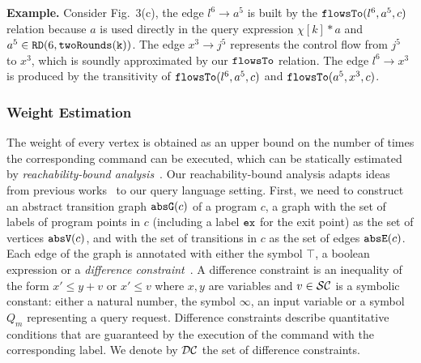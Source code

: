 \textbf{Example.}
Consider Fig.~3(c),  
the edge $l^6 \to a^5$ is built by the $\mathtt{flowsTo}(l^6, a^5, c)$ relation because
$a$ is used directly in the query expression $\chi[k]*a$
and $a^5 \in \mathtt{RD}(6, \mathtt{twoRounds(k)})$.
The edge $x^3 \to j^5$  represents the control flow from $j^5$ to $x^3$, which is soundly approximated by our $\mathtt{flowsTo}$ relation.
The edge $l^6 \to x^3$ is produced by the transitivity of $\mathtt{flowsTo}(l^6, a^5, c)$ and $\mathtt{flowsTo}(a^5, x^3, c)$. 

\subsubsection{Weight Estimation}
\label{sec:alg_weightgen}

The weight of every vertex is obtained as an upper bound on 
the number of times the corresponding command can be executed,
which can be statically estimated by \emph{reachability-bound analysis}~\cite{GulwaniZ10}.
Our reachability-bound analysis adapts ideas from previous works~\cite{ZulegerGSV11,SinnZV14,sinn2017complexity} 
to our query language setting. First, we need to 
construct an abstract transition graph $\mathtt{abs}{\mathtt{G}}(c)$ of a program $c$, a
graph with the set of labels of program points in $c$  (including a 
label $\mathtt{ex}$ for the exit point) as the set of
vertices $\mathtt{abs}{\mathtt{V}}(c)$, and with the set of transitions in $c$ as the set of
edges $\mathtt{abs}{\mathtt{E}}(c)$. Each edge of the graph is annotated with either
the symbol $\top$, a boolean expression or a \emph{difference
constraint}~\cite{sinn2017complexity}. A difference constraint is an
inequality of the form $x' \leq y + v$ {or $x' \leq v$}
where $x, y$ are variables and $v \in \mathcal{SC}$ is a symbolic
constant: either a natural number, the symbol $\infty$, an input
variable or a symbol $Q_m$ representing a query request. Difference constraints describe
quantitative conditions that are guaranteed by the execution of the command with
the corresponding label. We denote by
$\mathcal{DC}$ the set of difference constraints.
%

